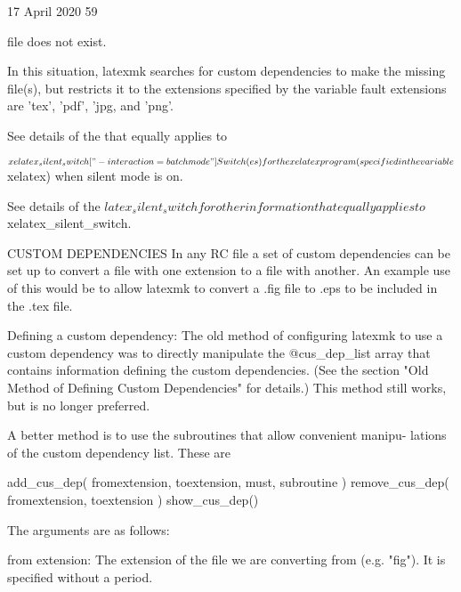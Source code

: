                                  17 April 2020                              59








              file does not exist.

              In this situation, latexmk searches for custom  dependencies  to
              make  the  missing  file(s),  but restricts it to the extensions
              specified by the variable  %
              fault extensions are 'tex', 'pdf', 'jpg, and 'png'.

              See details of the %
              that equally applies to %

       $xelatex_silent_switch ["-interaction=batchmode"]
              Switch(es) for the xelatex program (specified  in  the  variable
              $xelatex) when silent mode is on.

              See  details  of  the $latex_silent_switch for other information
              that equally applies to $xelatex_silent_switch.




CUSTOM DEPENDENCIES
       In any RC file a set of custom dependencies can be set up to convert  a
       file with one extension to a file with another.  An example use of this
       would be to allow latexmk to convert a .fig file to .eps to be included
       in the .tex file.


   Defining a custom dependency:
       The old method of configuring latexmk to use a custom dependency was to
       directly manipulate the @cus_dep_list array that  contains  information
       defining  the  custom  dependencies.   (See  the section "Old Method of
       Defining Custom Dependencies" for details.) This  method  still  works,
       but is no longer preferred.

       A better method is to use the subroutines that allow convenient manipu-
       lations of the custom dependency list.  These are

           add_cus_dep( fromextension, toextension, must, subroutine )
           remove_cus_dep( fromextension, toextension )
           show_cus_dep()

       The arguments are as follows:

       from extension:
              The extension of the file we are converting from  (e.g.  "fig").
              It is specified without a period.


